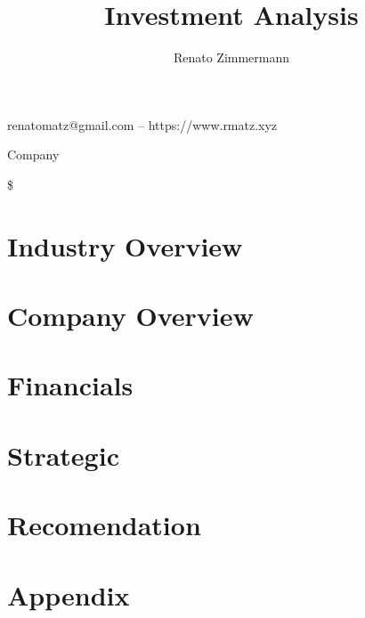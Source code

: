 \documentclass{article}
\makeatletter
\renewcommand{\maketitle}{
\hspace{-.4cm}\begin{minipage}[t]{.6\textwidth}
{\huge\bfseries\thetitle}

\vspace{.1cm}{\large\itshape\theauthor}

renatomatz@gmail.com -- https://www.rmatz.xyz

\end{minipage}
\hfill\vline\hfill
\begin{minipage}[t]{.3\textwidth}
{\Large\company}

\vspace{.1cm}{\large\bfseries\ticker}

\$
\end{minipage}
\vspace{.5cm}
\hline\hline
}
\newcommand{\company}{Company}
\newcommand{\ticker}{TKR}
\makeatother
\begin{document}
\title{Investment Analysis}
\author{Renato Zimmermann}

\maketitle

\section{Industry Overview}

\section{Company Overview}

\section{Financials}

\section{Strategic}

\section{Recomendation}

\newpage

\section{Appendix}
\end{document}
